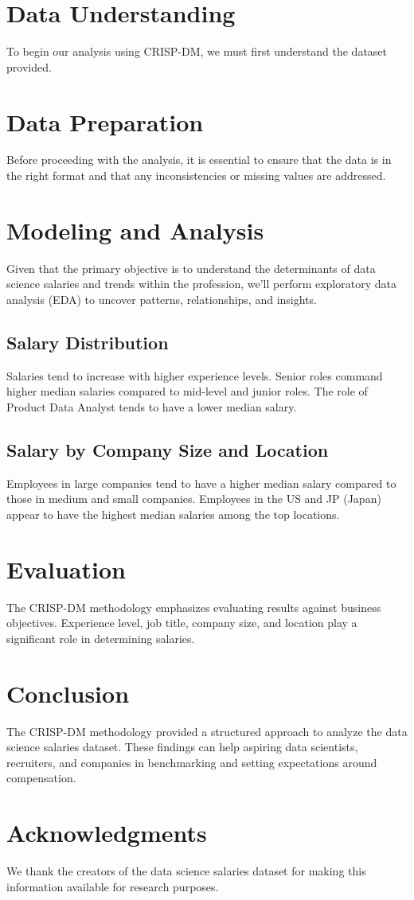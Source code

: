\documentclass[12pt]{article}
\begin{document}
\section{Data Understanding}
To begin our analysis using CRISP-DM, we must first understand the dataset provided.

\section{Data Preparation}
Before proceeding with the analysis, it is essential to ensure that the data is in the right format and that any inconsistencies or missing values are addressed.

\section{Modeling and Analysis}
Given that the primary objective is to understand the determinants of data science salaries and trends within the profession, we'll perform exploratory data analysis (EDA) to uncover patterns, relationships, and insights.

\subsection{Salary Distribution}
Salaries tend to increase with higher experience levels. Senior roles command higher median salaries compared to mid-level and junior roles. The role of Product Data Analyst tends to have a lower median salary.

\subsection{Salary by Company Size and Location}
Employees in large companies tend to have a higher median salary compared to those in medium and small companies. Employees in the US and JP (Japan) appear to have the highest median salaries among the top locations.

\section{Evaluation}
The CRISP-DM methodology emphasizes evaluating results against business objectives. Experience level, job title, company size, and location play a significant role in determining salaries.

\section{Conclusion}
The CRISP-DM methodology provided a structured approach to analyze the data science salaries dataset. These findings can help aspiring data scientists, recruiters, and companies in benchmarking and setting expectations around compensation.

\section*{Acknowledgments}
We thank the creators of the data science salaries dataset for making this information available for research purposes.
\end{document}

